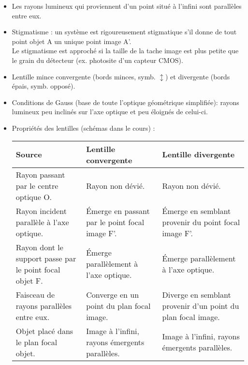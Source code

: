 \documentclass[a4paper,12pt]{article}
\begin{document}
\begin{itemize}
    \item Les rayons lumineux qui proviennent d'un point situé à l'infini sont parallèles entre eux.
    
    \item Stigmatisme : un système est rigoureusement stigmatique s'il donne de tout point objet A un unique point image A'. \\
    Le stigmatisme est approché si la taille de la tache image est plus petite que le grain du détecteur (ex. photosite d'un capteur CMOS).

    \item Lentille mince convergente (bords minces, symb. $\updownarrow$) et divergente (bords épais, symb. opposé).
    
    \item Conditions de Gauss (base de toute l'optique géométrique simplifiée): rayons lumineux peu inclinés sur l'axe optique et peu éloignés de celui-ci.
    
    \item Propriétés des lentilles (schémas dans le cours) :
    \renewcommand{\arraystretch}{1.4}
    \begin{center}
    \begin{tabular}{| p{5cm} | p{5.1cm} | p{5.1cm} |}
        \hline
        \textbf{Source} & \textbf{Lentille convergente} & \textbf{Lentille divergente} \\
        \hline
        Rayon passant par le centre optique O. & Rayon non dévié. & Rayon non dévié. \\
        \hline
        Rayon incident parallèle à l'axe optique. & Émerge en passant par le point focal image F'. & Émerge en semblant provenir du point focal image F'. \\
        \hline
        Rayon dont le support passe par le point focal objet F. & Émerge parallèlement à l'axe optique. & Émerge parallèlement à l'axe optique. \\
        \hline
        Faisceau de rayons parallèles entre eux. & Converge en un point du plan focal image. & Diverge en semblant provenir d'un point du plan focal image. \\
        \hline
        Objet placé dans le plan focal objet. & Image à l'infini, rayons émergents parallèles. & Image à l'infini, rayons émergents parallèles. \\
        \hline
    \end{tabular}
    \end{center}
    \renewcommand{\arraystretch}{1}


\end{itemize}
\end{document}
